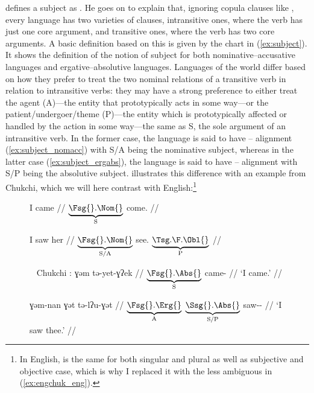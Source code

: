 \citet{dixon2010a} defines a subject as . He goes on to explain that,
ignoring copula clauses like , every language has
two varieties of clauses, intransitive ones, where the verb has just one core
argument, and transitive ones, where the verb has two core arguments. A basic
definition based on this is given by the chart in (\ref{ex:subject}). It shows
the definition of the notion of subject for both nominative--accusative
languages and ergative--absolutive languages. Languages of the world differ
based on how they prefer to treat the two nominal relations of a transitive
verb in relation to intransitive verbs: they may have a strong preference to
either treat the agent (A)---the entity that prototypically acts in some
way---or the patient/undergoer/theme (P)---the entity which is prototypically
affected or handled by the action in some way---the same as S, the sole
argument of an intransitive verb. In the former case, the language is said to
have \Nom{}--\Acc{} alignment (\ref{ex:subject_nomacc}) with S/A being the
nominative subject, whereas in the latter case (\ref{ex:subject_ergabs}), the
language is said to have \Erg{}--\Abs{} alignment with S/P being the absolutive
subject. \citet{comrie1989} illustrates this difference with an example from
Chukchi, which we will here contrast with English:\footnote{In English,
 is the same for both singular and plural as well as subjective and
objective case, which is why I replaced it with the less ambiguous
 in (\ref{ex:engchuk_eng}).}

\begin{figure}[h]
\pex\label{ex:engchuk_eng}
\a\label{ex:engchuk_eng1}\begingl
	\gla I came //
	\glb $\underbrace{\text{\Fsg{}.\Nom{}}}_{\text{S}}$
		come.\Pst{} //
\endgl

\a\label{ex:engchuk_eng2}\begingl
	\gla I saw her //
	\glb $\underbrace{\text{\Fsg{}.\Nom{}}}_{\text{S/A}}$
		see.\Pst{}
		$\underbrace{\text{\TsgF{}.\Obl{}}}_{\text{P}}$
		//
\endgl

\xe
\end{figure}

\begin{figure}[h]
\pex~\label{ex:engchuk_chuk}%
Chukchi \parencite[adapted from][104]{comrie1989}:
\a\label{ex:engchuk_chuk1}\begingl
	\gla ɣəm tə-yet-ɣʔek //
	\glb $\underbrace{\text{\Fsg{}.\Abs{}}}_{\text{S}}$
		came-\Fsg{} //
	\glft `I came.' //
\endgl

\a\label{ex:engchuk_chuk2}\begingl
	\gla ɣəm-nan ɣət tə-lʔu-ɣət //
	\glb $\underbrace{\text{\Fsg{}.\Erg{}}}_{\text{A}}$
		$\underbrace{\text{\Ssg{}.\Abs{}}}_{\text{S/P}}$
		saw-\Fsg{}-\Ssg{} //
	\glft `I saw thee.' //
\endgl

\xe
\end{figure}

